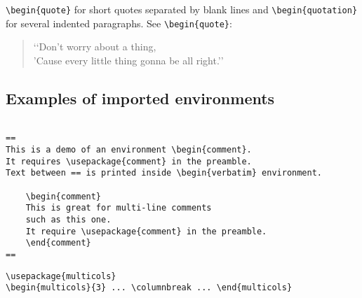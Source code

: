 \documentclass[a4paper,11pt]{article}
\begin{document}
\verb|\begin{quote}| for short quotes separated by blank lines and \verb|\begin{quotation}| for several indented paragraphs. See \verb|\begin{quote}|:

\begin{quote}
	\lq\lq Don't worry about a thing,\\
	'Cause every little thing gonna be all right.\rq\rq
\end{quote}

\subsection{Examples of imported environments}


\begin{verbatim}

==
This is a demo of an environment \begin{comment}. 
It requires \usepackage{comment} in the preamble. 
Text between == is printed inside \begin{verbatim} environment.

	\begin{comment}
	This is great for multi-line comments 
	such as this one.
	It require \usepackage{comment} in the preamble.
	\end{comment}
==
\end{verbatim}

\verb|\usepackage{multicols}| \\
\verb|\begin{multicols}{3} ... \columnbreak ... \end{multicols}|
\end{document}
